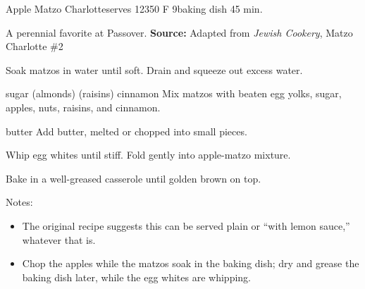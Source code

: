 \begin{recipe}{Apple Matzo Charlotte}{serves 12}{350\0 F \hfill 9\inch{}\inch baking dish \hfill 45 min.}

 \freeform A perennial favorite at Passover.
 \textbf{Source:} Adapted from \textit{Jewish Cookery}, Matzo Charlotte \#2

 Soak matzos in water until soft. Drain and squeeze out excess water.

  {sugar}
  {(almonds)}
  {(raisins)}
  {cinnamon}
 Mix matzos with beaten egg yolks, sugar, apples, nuts, raisins, and cinnamon.

  {butter}
 Add butter, melted or chopped into small pieces.

 Whip egg whites until stiff. Fold gently into apple-matzo mixture.

 \newstep Bake in a well-greased casserole until golden brown on top.

 \freeform Notes:
 \begin{itemize}
  \item The original recipe suggests this can be served plain or ``with lemon sauce,'' whatever that is.
  \item Chop the apples while the matzos soak in the baking dish; dry and grease the baking dish later, while the egg whites are whipping.
 \end{itemize}
\end{recipe}
